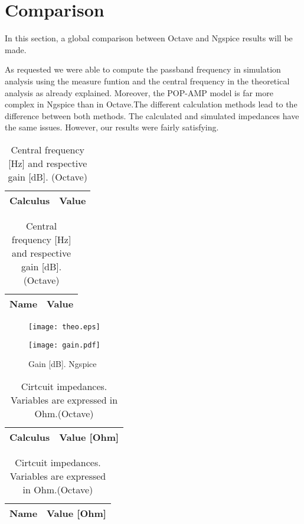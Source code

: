 \section{Comparison}
\label{section:comparison}

\par In this section, a global comparison between Octave and Ngspice results will be made. 

\par As requested we were able to compute the passband frequency in simulation analysis using the measure funtion and the central frequency in the theoretical analysis as already explained. Moreover, the POP-AMP model is far more complex in Ngspice than in Octave.The different calculation methods lead to the difference between both methods. The calculated and simulated impedances have the same issues. However, our results were fairly satisfying.


 \begin{table}[h]
\parbox{.45\linewidth}{
  \centering
  \begin{tabular}{|l|r|}
    \hline    
    {\bf Calculus} & {\bf Value} \\ \hline
    
  \end{tabular}
  \caption{Central frequency [Hz] and respective gain [dB]. (Ngspice)}} 
\parbox{.45\linewidth}{
 \centering
  \begin{tabular}{|l|r|}
    \hline    
    {\bf Name} & {\bf Value} \\ \hline
    
  \end{tabular}
  \caption{Central frequency [Hz] and respective gain [dB]. (Octave)}}
\end{table}



\begin{figure}[ht]
\centering
\parbox{.49\linewidth}{
  \centering
  \texttt{[image: theo.eps]}
  \caption{Gain [dB]. Octave}
  \label{fig:sim6} }
\parbox{.49\linewidth}{
  \centering
  \texttt{[image: gain.pdf]}
  \caption{Gain [dB]. Ngspice}
  \label{fig:sim6}

}
\end{figure}



\begin{table}[ht]
\parbox{.45\linewidth}{
  \centering
  \begin{tabular}{|l|r|}
    \hline    
    {\bf Calculus} & {\bf Value [Ohm]} \\ \hline
    
  \end{tabular}
  \caption{Cirtcuit impedances. Variables are expressed in Ohm.(Ngspice)}} 
\parbox{.45\linewidth}{
 \centering
  \begin{tabular}{|l|r|}
    \hline    
    {\bf Name} & {\bf Value [Ohm]} \\ \hline
    
  \end{tabular}
  \caption{Cirtcuit impedances. Variables are expressed in Ohm.(Octave)}}
\end{table}


